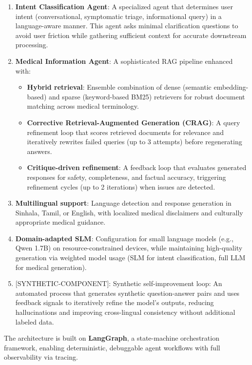 \documentclass[11pt,a4paper]{article}
\newcommand{\synthetic}[1]{{\colorbox{syntheticcolor}{[SYNTHETIC-COMPONENT]: #1}}}
\begin{document}
\begin{enumerate}
    \item \textbf{Intent Classification Agent}: A specialized agent that determines user intent (conversational, symptomatic triage, informational query) in a language-aware manner. This agent asks minimal clarification questions to avoid user friction while gathering sufficient context for accurate downstream processing.
    
    \item \textbf{Medical Information Agent}: A sophisticated RAG pipeline enhanced with:
    \begin{itemize}
        \item \textbf{Hybrid retrieval}: Ensemble combination of dense (semantic embedding-based) and sparse (keyword-based BM25) retrievers for robust document matching across medical terminology.
        \item \textbf{Corrective Retrieval-Augmented Generation (CRAG)}: A query refinement loop that scores retrieved documents for relevance and iteratively rewrites failed queries (up to 3 attempts) before regenerating answers.
        \item \textbf{Critique-driven refinement}: A feedback loop that evaluates generated responses for safety, completeness, and factual accuracy, triggering refinement cycles (up to 2 iterations) when issues are detected.
    \end{itemize}
    
    \item \textbf{Multilingual support}: Language detection and response generation in Sinhala, Tamil, or English, with localized medical disclaimers and culturally appropriate medical guidance.
    
    \item \textbf{Domain-adapted SLM}: Configuration for small language models (e.g., Qwen 1.7B) on resource-constrained devices, while maintaining high-quality generation via weighted model usage (SLM for intent classification, full LLM for medical generation).
    
    \item \synthetic{Synthetic self-improvement loop}: An automated process that generates synthetic question-answer pairs and uses feedback signals to iteratively refine the model's outputs, reducing hallucinations and improving cross-lingual consistency without additional labeled data.
\end{enumerate}

The architecture is built on \textbf{LangGraph}, a state-machine orchestration framework, enabling deterministic, debuggable agent workflows with full observability via tracing.
\end{document}
